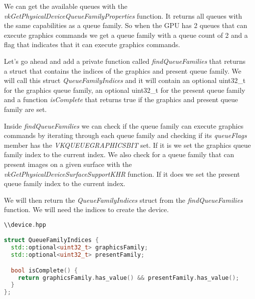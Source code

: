 \documentclass[12pt]{report} \usepackage{preamble}
\begin{document}
We can get the available queues with the \textit{vkGetPhysicalDeviceQueueFamilyProperties} function.
It returns all queues with the same capabilities as a queue family. So when the GPU has 2 queues
that can execute graphics commands we get a queue family with a queue count of 2 and a flag that
indicates that it can execute graphics commands.

Let's go ahead and add a private function called \textit{findQueueFamilies} that returns a struct
that contains the indices of the graphics and present queue family. We will call this struct
\textit{QueueFamilyIndices} and it will contain an optional uint32\_t for the graphics queue family,
an optional uint32\_t for the present queue family and a function \textit{isComplete} that returns
true if the graphics and present queue family are set.

Inside \textit{findQueueFamilies} we can check if the queue family can execute graphics commands by iterating through each queue family
and checking if its \textit{queueFlags} member has the \textit{VK\textunderscore QUEUE\textunderscore GRAPHICS\textunderscore BIT} set.
If it is we set the graphics queue family index to the current index. We also check for a queue family that can present images
on a given surface with the \textit{vkGetPhysicalDeviceSurfaceSupportKHR} function. If it does we set the present queue family index
to the current index.

We will then return the \textit{QueueFamilyIndices} struct from the \textit{findQueueFamilies} function. We will need the indices
to create the device.

\begin{lstlisting}[language=C++]
\\device.hpp

struct QueueFamilyIndices {
  std::optional<uint32_t> graphicsFamily;
  std::optional<uint32_t> presentFamily;

  bool isComplete() {
    return graphicsFamily.has_value() && presentFamily.has_value();
  }
};
\end{lstlisting}
\end{document}
